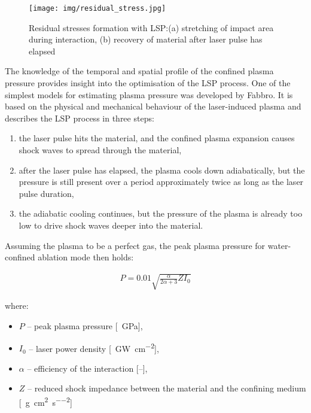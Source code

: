 \begin{figure}[h]
    \centering
    \texttt{[image: img/residual\_stress.jpg]}
    \caption{Residual stresses formation with LSP:(a) stretching of impact area during interaction, (b) recovery of material after laser pulse has elapsed \protect\cite{fabbro_peyre_berthe_scherpereel_1998}}
    \label{fig:lspresidual}
\end{figure}


The knowledge of the temporal and spatial profile of the confined plasma pressure provides insight into the optimisation of the LSP process. One of the simplest models for estimating plasma pressure was developed by Fabbro. It is based on the physical and mechanical behaviour of the laser-induced plasma and describes the LSP process in three steps:

\begin{enumerate}
    \item the laser pulse hits the material, and the confined plasma expansion causes shock waves to spread through the material,
    \item after the laser pulse has elapsed, the plasma cools down adiabatically, but the pressure is still present over a period approximately twice as long as the laser pulse duration,
    \item the adiabatic cooling continues, but the pressure of the plasma is already too low to drive shock waves deeper into the material.
\end{enumerate}

Assuming the plasma to be a perfect gas, the peak plasma pressure for water-confined ablation mode then holds:

\begin{gather} \label{pressure}
P = 0.01\sqrt{\frac{\alpha}{2\alpha + 3} Z I_{0} }   
\end{gather} 

where:

\begin{itemize}

    \item $P$ -- peak plasma pressure [\SI{}{\giga\pascal}],

    \item $I_{0}$ -- laser power density [\SI{}{\giga\watt\per\cm\squared}],
    
    \item $\alpha$ -- efficiency of the interaction [--],
    
    \item $Z$ -- reduced shock impedance between the material and the confining medium [\SI{}{\gram\per\cm\squared\per\second\squared}]
\end{itemize}
    
